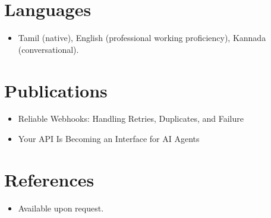 \documentclass[11pt,a4paper,sans]{moderncv}
\begin{document}
\section{Languages}
\vspace{1pt}
\begin{itemize}
\item {Tamil (native), English (professional working proficiency), Kannada (conversational).}
\end{itemize}


\section{Publications}
\vspace{1pt}
\begin{itemize}
\item {Reliable Webhooks: Handling Retries, Duplicates, and Failure}
\item {Your API Is Becoming an Interface for AI Agents}
\end{itemize}


\section{References}
\vspace{1pt}
\begin{itemize}
\item{Available upon request.}
\end{itemize}
\end{document}
